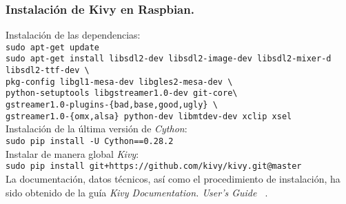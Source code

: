 \subsubsection{Instalación de Kivy en Raspbian.}

Instalación de las dependencias:\\
\colorbox[gray]{0.85}{\texttt{sudo apt-get update}}\\
\colorbox[gray]{0.85}{\texttt{sudo apt-get install libsdl2-dev libsdl2-image-dev libsdl2-mixer-d libsdl2-ttf-dev \textbackslash}}\\
\colorbox[gray]{0.85}{\hspace{0.8cm} \texttt{pkg-config libgl1-mesa-dev libgles2-mesa-dev \textbackslash}}\\ 
\colorbox[gray]{0.85}{\hspace{0.8cm} \texttt{python-setuptools  libgstreamer1.0-dev git-core\textbackslash}}\\ 
\colorbox[gray]{0.85}{\hspace{0.8cm} \texttt{gstreamer1.0-plugins-\{bad,base,good,ugly\} \textbackslash}}\\
\colorbox[gray]{0.85}{\hspace{0.8cm} \texttt{gstreamer1.0-\{omx,alsa\} python-dev libmtdev-dev xclip xsel}}\\
Instalación de la última versión de \emph{Cython}:\\
\colorbox[gray]{0.85}{\texttt{sudo pip install -U Cython==0.28.2}}\\
Instalar de manera global \emph{Kivy}:\\
\colorbox[gray]{0.85}{\texttt{sudo pip install git+https://github.com/kivy/kivy.git@master
}}\\

La documentación, datos técnicos, así como el procedimiento de instalación, ha sido obtenido de la guía \emph{Kivy Documentation. User's Guide ~\cite{Kivy}}.  

